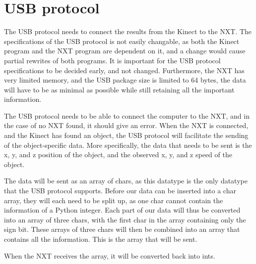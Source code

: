 \section{USB protocol}
\label{sec:design-usb}
The USB protocol needs to connect the results from the Kinect to the NXT. The specifications of the USB protocol is not easily changable, as both the Kinect program and the NXT program are dependent on it, and a change would cause partial rewrites of both programs. It is important for the USB protocol specifications to be decided early, and not changed.
Furthermore, the NXT has very limited memory, and the USB package size is limited to 64 bytes, the data will have to be as minimal as possible while still retaining all the important information. 

The USB protocol needs to be able to connect the computer to the NXT, and in the case of no NXT found, it should give an error.
When the NXT is connected, and the Kinect has found an object, the USB protocol will facilitate the sending of the object-specific data.
More specifically, the data that needs to be sent is the x, y, and z position of the object, and the observed x, y, and z speed of the object.

The data will be sent as an array of chars, as this datatype is the only datatype that the USB protocol supports. Before our data can be inserted into a char array, they will each need to be split up, as one char cannot contain the information of a Python integer. Each part of our data will thus be converted into an array of three chars, with the first char in the array containing only the sign bit. These arrays of three chars will then be combined into an array that contains all the information. This is the array that will be sent.

When the NXT receives the array, it will be converted back into ints.